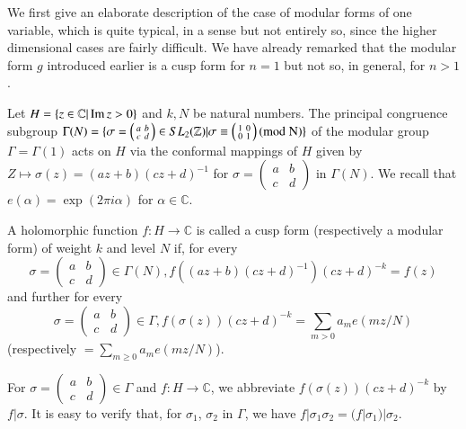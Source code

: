 We first give an elaborate description of the case of modular forms of
one variable, which is quite typical, in a sense but not entirely so,
since the higher dimensional cases are fairly difficult. We have
already remarked that the modular form $g$ introduced earlier is a
cusp form for $n=1$ but not so, in general, for $n>1$.

Let $H=\{z\in\mathbb{C}|\operatorname{Im} z>0\}$ and $k,N$ be natural numbers. The
principal congruence subgroup
$\Gamma(N)=\{\sigma=\left(\begin{smallmatrix} a & b\\ c & d
\end{smallmatrix}\right)\in SL_{2}(\mathbb{Z})|\sigma \equiv
\left(\begin{smallmatrix} 1 & 0\\ 0 & 1
\end{smallmatrix}\right)(\rm{mod} \; N)\}$ of the modular group
$\Gamma=\Gamma(1)$ acts on $H$ via the conformal mappings of $H$ given
by $Z\mapsto \sigma(z)=(az+b)(cz+d)^{-1}$ for
$\sigma=\left(\begin{smallmatrix} a & b\\ c & d
\end{smallmatrix}\right)$ in $\Gamma(N)$. We recall that
$e(\alpha)=\exp (2\pi i\alpha)$ for $\alpha\in \mathbb{C}$.

\begin{defi*}
A holomorphic function $f:H\to \mathbb{C}$ is called a cusp form
(respectively a modular form) of weight $k$ and level $N$ if, for
every 
$$
\sigma=
\begin{pmatrix}
a & b\\
c & d
\end{pmatrix}\in\Gamma(N), f((az+b)(cz+d)^{-1})(cz+d)^{-k}=f(z)
$$
and further for every
$$
\sigma=
\begin{pmatrix}
a & b\\
c & d
\end{pmatrix}
\in\Gamma, f(\sigma(z))(cz+d)^{-k}=\sum_{m>0}a_{m}e(mz/N)
$$
(respectively $=\sum\limits_{m\geq 0}a_{m}e(mz/N)$).
\end{defi*}

For $\sigma=\left(\begin{smallmatrix} a & b\\ c & d
\end{smallmatrix}\right)\in\Gamma$ and $f:H\to \mathbb{C}$, we
abbreviate $f(\sigma(z))(cz+d)^{-k}$ by $f|\sigma$. It is easy to
verify that, for $\sigma_{1}$, $\sigma_{2}$ in $\Gamma$, we have
$f|\sigma_{1}\sigma_{2}=(f|\sigma_{1})|\sigma_{2}$.

